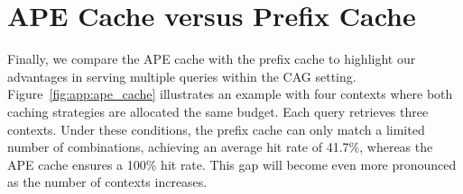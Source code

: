 \section{APE Cache versus Prefix Cache}

Finally, we compare the APE cache with the prefix cache to highlight our advantages in serving multiple queries within the CAG setting. Figure~\ref{fig:app:ape_cache} illustrates an example with four contexts where both caching strategies are allocated the same budget. Each query retrieves three contexts. Under these conditions, the prefix cache can only match a limited number of combinations, achieving an average hit rate of 41.7\%, whereas the APE cache ensures a 100\% hit rate. This gap will become even more pronounced as the number of contexts increases.

